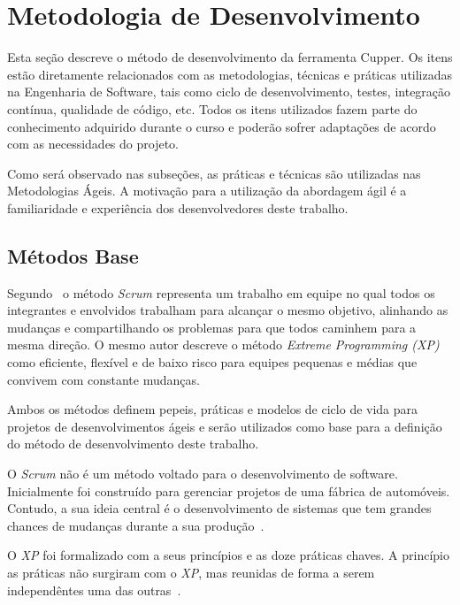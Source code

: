 \section{Metodologia de Desenvolvimento}
\label{sec:desenvolvimento}

Esta seção descreve o método de desenvolvimento da ferramenta Cupper.
Os itens estão diretamente relacionados com as metodologias, técnicas e
práticas utilizadas na Engenharia de Software, tais como ciclo de
desenvolvimento, testes, integração contínua, qualidade de código, etc.
Todos os itens utilizados fazem parte do conhecimento adquirido durante
o curso e poderão sofrer adaptações de acordo com as necessidades do projeto.

Como será observado nas subseções, as práticas e técnicas são utilizadas
nas Metodologias Ágeis. A motivação para a utilização da abordagem
ágil é a familiaridade e experiência dos desenvolvedores deste trabalho.

\subsection{Métodos Base}
\label{sec:metodo_base}

Segundo~ o método \textit{Scrum} representa um trabalho
em equipe no qual todos os integrantes e envolvidos trabalham para alcançar
o mesmo objetivo, alinhando as mudanças e compartilhando os problemas para que
todos caminhem para a mesma direção. O mesmo autor descreve o método
\textit{Extreme Programming (XP)} como eficiente, flexível e de baixo risco para equipes
pequenas e médias que convivem com constante mudanças.

Ambos os métodos definem pepeis, práticas e modelos de ciclo de vida para
projetos de desenvolvimentos ágeis e serão utilizados como base para a definição
do método de desenvolvimento deste trabalho.

O \textit{Scrum} não é um método voltado para o desenvolvimento de software. Inicialmente
foi construído para gerenciar projetos de uma fábrica de automóveis.
Contudo, a sua ideia central é o desenvolvimento de sistemas que tem grandes
chances de mudanças durante a sua produção~\cite{fadel:2010}.

O \textit{XP} foi formalizado com a seus princípios e as doze práticas chaves. A princípio
as práticas não surgiram com o \textit{XP}, mas reunidas de forma a serem independêntes uma
das outras~\cite{fadel:2010}.


